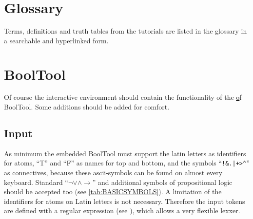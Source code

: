 %
%


\section{Glossary}

Terms, definitions and truth tables from the tutorials are listed in the glossary in a searchable and hyperlinked form.

\section{BoolTool}

Of course the interactive environment should contain the functionality of the \href{web fronted} of BoolTool.
Some additions should be added for comfort.

\subsection{Input}

As minimum the embedded BoolTool must support the latin letters as identifiers for atoms, 
“T” and “F” as names for top and bottom, and the symbols
“\verb#!&.|+>^#” as connectives, because these ascii-symbols can be found on almost every keyboard.
Standard “$ \neg \vee \wedge \rightarrow $” and additional symbols of propositional logic
 should be accepted too (see \ref{tab:BASICSYMBOLS}).
A limitation of the identifiers for atoms on Latin letters is not necessary.
Therefore the input tokens are defined with a regular expression (see ),
which allows a very flexible lexxer.







